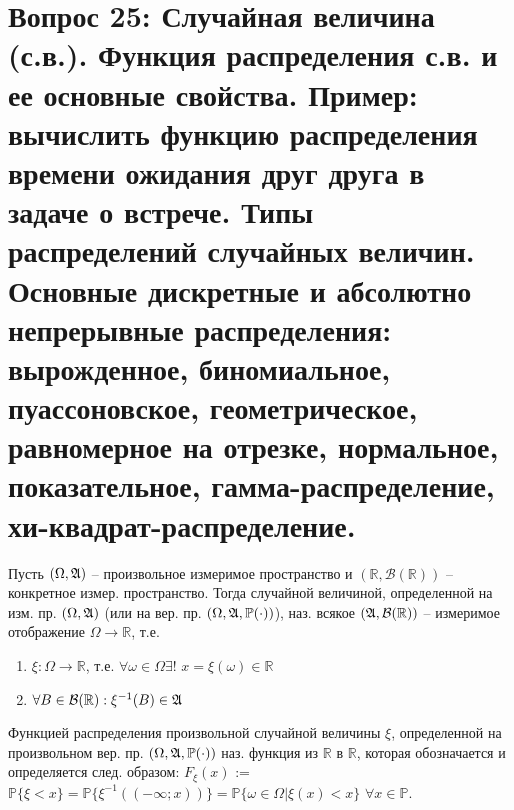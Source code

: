 \section{Вопрос 25: Случайная величина (с.в.). Функция распределения с.в. и ее основные свойства. Пример: вычислить функцию распределения времени ожидания друг друга в задаче о встрече. Типы распределений случайных величин. Основные дискретные и абсолютно непрерывные распределения: вырожденное, биномиальное, пуассоновское, геометрическое, равномерное на отрезке, нормальное, показательное, гамма-распределение, хи-квадрат-распределение.}

\begin{defs}
	Пусть $(\Omega, \mathfrak{A})$ -- произвольное измеримое пространство и $(\mathbb{R}, \mathcal{B}(\mathbb{R}))$ -- конкретное измер. пространство.
	Тогда случайной величиной, определенной на изм. пр. $(\Omega, \mathfrak{A})$ (или на вер. пр. $(\Omega, \mathfrak{A}, \mathbb{P}(\cdot))$), наз. всякое
	$(\mathfrak{A}, \mathcal{B}(\mathbb{R}))$ -- измеримое отображение $\Omega \to \mathbb{R}$, т.е.
	\begin{enumerate}
	\item $\xi:\Omega \to \mathbb{R}$, т.е. $\forall \omega \in \Omega \exists$! $x=\xi(\omega) \in \mathbb{R}$
	\item $\forall B \in \mathcal{B}(\mathbb{R}): \xi^{-1}(B)\in \mathfrak{A}$
	\end{enumerate}
\end{defs}

\begin{defs}
	Функцией распределения произвольной случайной величины $\xi$, определенной на произвольном вер. пр.  $(\Omega, \mathfrak{A}, \mathbb{P}(\cdot))$ наз. функция из $\mathbb{R}$ в $\mathbb{R}$,
	которая обозначается и определяется след. образом:
	$F_{\xi}(x)$ := $\mathbb{P} \{ \xi < x \} = \mathbb{P}\{\xi^{-1}((-\infty;x))\} = \mathbb{P}\{\omega \in \Omega| \xi(x) < x\}$ $\forall x \in \mathbb{P}$.
\end{defs}

